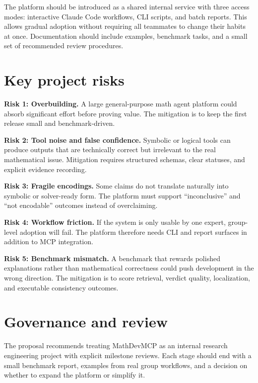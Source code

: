 The platform should be introduced as a shared internal service with three access modes: interactive Claude Code workflows, CLI scripts, and batch reports. This allows gradual adoption without requiring all teammates to change their habits at once. Documentation should include examples, benchmark tasks, and a small set of recommended review procedures.

\section{Key project risks}

\begin{riskbox}
\textbf{Risk 1: Overbuilding.} A large general-purpose math agent platform could absorb significant effort before proving value. The mitigation is to keep the first release small and benchmark-driven.
\end{riskbox}

\begin{riskbox}
\textbf{Risk 2: Tool noise and false confidence.} Symbolic or logical tools can produce outputs that are technically correct but irrelevant to the real mathematical issue. Mitigation requires structured schemas, clear statuses, and explicit evidence recording.
\end{riskbox}

\begin{riskbox}
\textbf{Risk 3: Fragile encodings.} Some claims do not translate naturally into symbolic or solver-ready form. The platform must support ``inconclusive'' and ``not encodable'' outcomes instead of overclaiming.
\end{riskbox}

\begin{riskbox}
\textbf{Risk 4: Workflow friction.} If the system is only usable by one expert, group-level adoption will fail. The platform therefore needs CLI and report surfaces in addition to MCP integration.
\end{riskbox}

\begin{riskbox}
\textbf{Risk 5: Benchmark mismatch.} A benchmark that rewards polished explanations rather than mathematical correctness could push development in the wrong direction. The mitigation is to score retrieval, verdict quality, localization, and executable consistency outcomes.
\end{riskbox}

\section{Governance and review}

The proposal recommends treating MathDevMCP as an internal research engineering project with explicit milestone reviews. Each stage should end with a small benchmark report, examples from real group workflows, and a decision on whether to expand the platform or simplify it.
